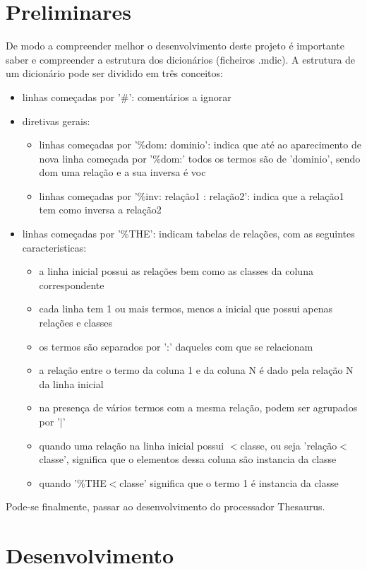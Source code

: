 \documentclass{llncs}
\begin{document}
\section{Preliminares}
De modo a compreender melhor o desenvolvimento deste projeto é importante saber e compreender a estrutura dos dicionários (ficheiros .mdic). 
A estrutura de um dicionário pode ser dividido em três conceitos:
\begin{itemize}
    \item linhas começadas por '\#': comentários a ignorar
    \item diretivas gerais:
        \begin{itemize}
            \item linhas começadas por '\%dom: dominio': indica que até ao aparecimento de nova linha começada por '\%dom:' todos os termos são de 'dominio', sendo dom uma relação e a sua inversa é voc
            \item linhas começadas por '\%inv: relação1 : relação2': indica que a relação1 tem como inversa a relação2
        \end{itemize}
    \item linhas começadas por '\%THE': indicam tabelas de relações, com as seguintes caracteristicas:
        \begin{itemize}
            \item a linha inicial possui as relações bem como as classes da coluna correspondente
            \item cada linha tem 1 ou mais termos, menos a inicial que possui apenas relações e classes
            \item os termos são separados por ':' daqueles com que se relacionam
            \item a relação entre o termo da coluna 1 e da coluna N é dado pela relação N da linha inicial
            \item na presença de vários termos com a mesma relação, podem ser agrupados por '$|$'
            \item quando uma relação na linha inicial possui $<$classe, ou seja 'relação$<$classe', significa que o elementos dessa coluna são instancia da classe
            \item quando '\%THE$<$classe' significa que o termo 1 é instancia da classe
        \end{itemize}
\end{itemize}
Pode-se finalmente, passar ao desenvolvimento do processador Thesaurus.

\section{Desenvolvimento}
\end{document}
